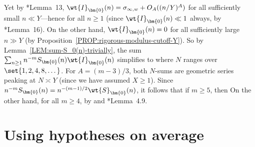 \documentclass[12pt]{report}
\begin{document}
Yet by \cite{heath1996new}*{Lemma~13},
$\wt{I}_{\bm{0}}(n) = \sigma_{\infty,w} + O_A((n/Y)^A)$
for all sufficiently small $n\ll Y$---hence
for all $n\geq1$
(since $\wt{I}_{\bm{0}}(n) \ll 1$ always,
by \cite{heath1996new}*{Lemma~16}).
On the other hand, $\wt{I}_{\bm{0}}(n)=0$ for all sufficiently large $n\gg Y$
(by Proposition~\ref{PROP:rigorous-modulus-cutoff-Y}).
So by Lemma~\ref{LEM:sum-S_0(n)-trivially}, the sum $\sum_{n\geq1} n^{-m}S_{\bm{0}}(n)\wt{I}_{\bm{0}}(n)$ simplifies to
where $N$ ranges over $\set{1,2,4,8,\dots}$.
For $A = (m-3)/3$, both $N$-sums are geometric series peaking at $N\asymp Y$ (since we have assumed $X\geq 1$).
Since $n^{-m}S_{\bm{0}}(n)=n^{-(m-1)/2}\wt{S}_{\bm{0}}(n)$, it follows that if $m\geq 5$, then
On the other hand, for all $m\geq 4$,
by \Holder and \cite{vaughan1997hardy}*{Lemma~4.9}.


\chapter{Using hypotheses on average}
\label{CHAP:using-hypotheses-on-average}

\end{document}
